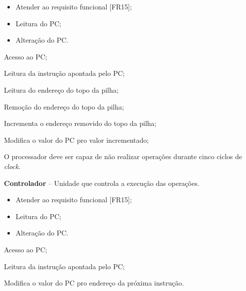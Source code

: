 \documentclass{article}
\begin{document}
  \preconditions 
  \begin{itemize}
  	\item Atender ao requisito funcional [FR15];
  	\item Leitura do PC;
  \end{itemize}
  
  \postconditions
  \begin{itemize}
  	\item Alteração do PC.
  \end{itemize}
  
  
  \begin{mainflow}
  	\item Acesso ao PC;
  	\item Leitura da instrução apontada pelo PC;
  	\item Leitura do endereço do topo da pilha;
  	\item Remoção do endereço do topo da pilha;
  	\item Incrementa o endereço removido do topo da pilha;
  	\item Modifica o valor do PC pro valor incrementado;
  \end{mainflow}
  
  O processador deve ser capaz de não realizar operações durante cinco ciclos de \textit{clock}.
  \actors
  \begin{description}
  	\item \textbf{Controlador} – Unidade que controla a execução das operações.
  \end{description}
  
  \preconditions 
  \begin{itemize}
  	\item Atender ao requisito funcional [FR15];
  	\item Leitura do PC;
  \end{itemize}
  
  \postconditions
  \begin{itemize}
  	\item Alteração do PC.
  \end{itemize}
  
  
  \begin{mainflow}
  	\item Acesso ao PC;
  	\item Leitura da instrução apontada pelo PC;
  	\item Modifica o valor do PC pro endereço da próxima instrução.
  \end{mainflow}
  
\end{document}
